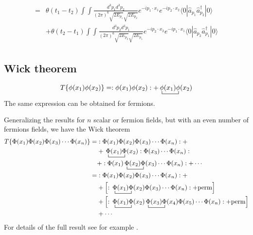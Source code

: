 \begin{align}
=&\theta(t_1-t_2)\int\int\frac{d^3p_1d^3p_2}{(2\pi)^6\sqrt{2E_{p_1}}\sqrt{2E_{p_2}}}e^{-i p_1\cdot x_1}e^{-i p_2\cdot x_2}
\langle0|\hat{a}_{p_1}\hat{a}_{p_2}^\dagger|0\rangle\nonumber\\
&+\theta(t_2-t_1)\int\int\frac{d^3p_2d^3p_1}{(2\pi)^6\sqrt{2E_{p_2}}\sqrt{2E_{p_1}}}e^{-i p_2\cdot x_2}e^{-i p_1\cdot x_1}
\langle0|\hat{a}_{p_2}\hat{a}_{p_1}^\dagger|0\rangle\nonumber\\
\end{align}

  

\subsection{Wick theorem}
\begin{align}
  T\{\phi(x_1)\phi(x_2)\}=:\phi(x_1)\phi(x_2):+\bcontraction{\,}{\phi}{(x_1)}{\phi}
\,\phi(x_1)\phi(x_2)
\end{align}
The same expression can be obtained for fermions.

  


 Generalizing  the results for $n$ scalar or fermion fields, but with an even number of fermions fields, we have the Wick theorem
\begin{align}
  T\{\Phi(x_1)\Phi(x_2)\Phi(x_3)\cdots\Phi(x_n) \}
=&:\Phi(x_1)\Phi(x_2)\Phi(x_3)\cdots\Phi(x_n):+\nonumber\\
&+\bcontraction{\,}{\Phi}{(x_1)}{\Phi}\,\Phi(x_1)\Phi(x_2):\Phi(x_3)\cdots\Phi(x_n):\nonumber\\
&+:\Phi(x_1)\bcontraction{\,}{\Phi}{(x_2)}{\Phi}\,\Phi(x_2)\Phi(x_3)\cdots\Phi(x_n):+\cdots  \nonumber\\
=&:\Phi(x_1)\Phi(x_2)\Phi(x_3)\cdots\Phi(x_n):+\nonumber\\
&+\left[:\bcontraction{\,}{\Phi}{(x_1)}{\Phi}\,\Phi(x_1)\Phi(x_2)\Phi(x_3)\cdots\Phi(x_n): +\text{perm} \right]\nonumber\\
&+\left[  :\bcontraction{\,}{\Phi}{(x_1)}{\Phi}\,\Phi(x_1)\Phi(x_2) \bcontraction{\,}{\Phi}{(x_3)}{\Phi}\,\Phi(x_3)\Phi(x_4)\Phi(x_5)\cdots\Phi(x_n): +\text{perm}  \right] \nonumber\\
&+\cdots \nonumber\\
\end{align}
For details of the full result see for example \cite{Lahiri:2005sm}.



